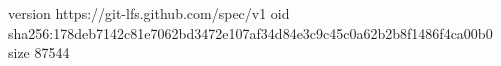 version https://git-lfs.github.com/spec/v1
oid sha256:178deb7142c81e7062bd3472e107af34d84e3c9c45c0a62b2b8f1486f4ca00b0
size 87544
